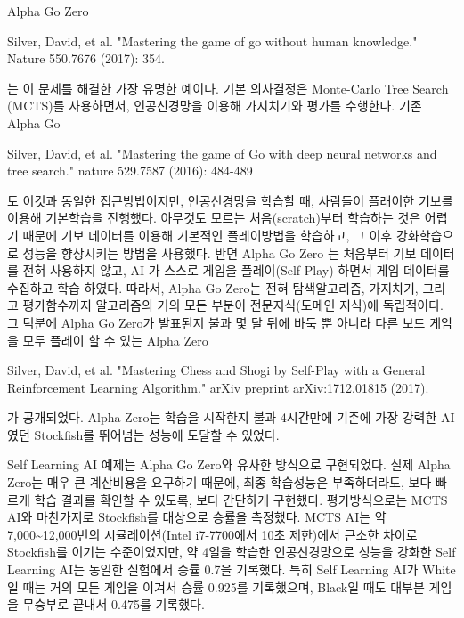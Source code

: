 \documentclass[letterpaper,10pt,english]{sphinxmanual}
\begin{document}
Alpha Go Zero %
\begin{footnote}[1]\sphinxAtStartFootnote
Silver, David, et al. "Mastering the game of go without human knowledge." Nature 550.7676 (2017): 354.
%
\end{footnote} 는 이 문제를 해결한 가장 유명한 예이다. 기본 의사결정은 Monte-Carlo Tree Search (MCTS)를 사용하면서,
인공신경망을 이용해 가지치기와 평가를 수행한다.
기존 Alpha Go %
\begin{footnote}[2]\sphinxAtStartFootnote
Silver, David, et al. "Mastering the game of Go with deep neural networks and tree search." nature 529.7587 (2016): 484-489
%
\end{footnote} 도 이것과 동일한 접근방법이지만, 인공신경망을 학습할 때, 사람들이 플래이한 기보를 이용해 기본학습을 진행했다.
아무것도 모르는 처음(scratch)부터 학습하는 것은 어렵기 때문에 기보 데이터를 이용해 기본적인 플레이방법을 학습하고,
그 이후 강화학습으로 성능을 향상시키는 방법을 사용했다.
반면 Alpha Go Zero 는 처음부터 기보 데이터를 전혀 사용하지 않고, AI 가 스스로 게임을 플레이(Self Play) 하면서
게임 데이터를 수집하고 학습 하였다.
따라서, Alpha Go Zero는 전혀 탐색알고리즘, 가지치기, 그리고 평가함수까지 알고리즘의 거의 모든 부분이 전문지식(도메인 지식)에 독립적이다.
그 덕분에 Alpha Go Zero가 발표된지 불과 몇 달 뒤에 바둑 뿐 아니라 다른 보드 게임을 모두 플레이 할 수 있는 Alpha Zero %
\begin{footnote}[3]\sphinxAtStartFootnote
Silver, David, et al. "Mastering Chess and Shogi by Self-Play with a General Reinforcement Learning Algorithm." arXiv preprint arXiv:1712.01815 (2017).
%
\end{footnote} 가 공개되었다.
Alpha Zero는 학습을 시작한지 불과 4시간만에 기존에 가장 강력한 AI였던 Stockfish를 뛰어넘는 성능에 도달할 수 있었다.

Self Learning AI 예제는 Alpha Go Zero와 유사한 방식으로 구현되었다. 실제 Alpha Zero는 매우 큰 계산비용을 요구하기 때문에,
최종 학습성능은 부족하더라도, 보다 빠르게 학습 결과를 확인할 수 있도록, 보다 간단하게 구현했다.
평가방식으로는 MCTS AI와 마찬가지로 Stockfish를 대상으로 승률을 측정했다.
MCTS AI는 약 7,000\textasciitilde{}12,000번의 시뮬레이션(Intel i7-7700에서 10초 제한)에서 근소한 차이로 Stockfish를 이기는 수준이었지만,
약 4일을 학습한 인공신경망으로 성능을 강화한 Self Learning AI는 동일한 실험에서 승률 0.7을 기록했다.
특히 Self Learning AI가 White 일 때는 거의 모든 게임을 이겨서 승률 0.925를 기록했으며,
Black일 때도 대부분 게임을 무승부로 끝내서 0.475를 기록했다.
\end{document}
